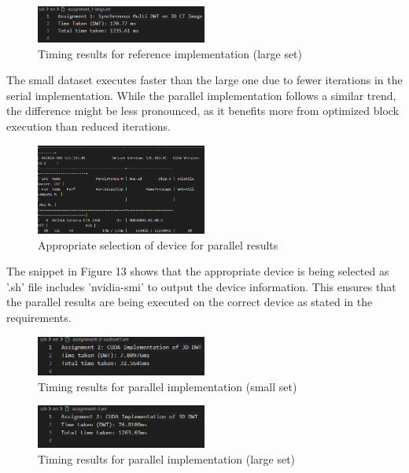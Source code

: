 \documentclass[journal,11pt]{IEEEtran}
\begin{document}
\begin{figure}[h]
    \centering
    \includegraphics[width=0.5\textwidth]{assets/1-large.png}
    \caption{Timing results for reference implementation (large set)}
    \label{fig:14}
\end{figure}

The small dataset executes faster than the large one due to fewer iterations in the serial implementation. While the parallel implementation follows a similar trend, the difference might be less pronounced, as it benefits more from optimized block execution than reduced iterations.

\begin{figure}[h]
    \centering
    \includegraphics[width=0.5\textwidth]{assets/correct-device.png}
    \caption{Appropriate selection of device for parallel results}
    \label{fig:15}
\end{figure}

The snippet in Figure 13 shows that the appropriate device is being selected as '.sh' file includes 'nvidia-smi' to output the device information. This ensures that the parallel results are being executed on the correct device as stated in the requirements.

\begin{figure}[h]
    \centering
    \includegraphics[width=0.5\textwidth]{assets/2-subset.png}
    \caption{Timing results for parallel implementation (small set)}
    \label{fig:16}
\end{figure}

\begin{figure}[h]
    \centering
    \includegraphics[width=0.5\textwidth]{assets/2-large.png}
    \caption{Timing results for parallel implementation (large set)}
    \label{fig:17}
\end{figure}
\end{document}
